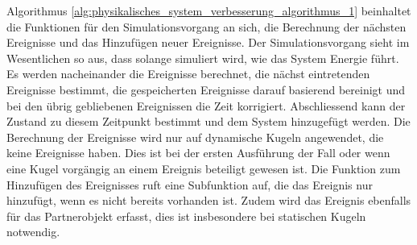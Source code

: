 Algorithmus \ref{alg:physikalisches_system_verbesserung_algorithmus_1} beinhaltet die Funktionen für den Simulationsvorgang
an sich, die Berechnung der nächsten Ereignisse und das Hinzufügen neuer Ereignisse. Der Simulationsvorgang sieht im
Wesentlichen so aus, dass solange simuliert wird, wie das System Energie führt. Es werden nacheinander die Ereignisse berechnet,
die nächst eintretenden Ereignisse bestimmt, die gespeicherten Ereignisse darauf basierend bereinigt und bei den übrig
gebliebenen Ereignissen die Zeit korrigiert. Abschliessend kann der Zustand zu diesem Zeitpunkt bestimmt und
dem System hinzugefügt werden. Die Berechnung der Ereignisse wird nur auf dynamische Kugeln angewendet, die keine Ereignisse haben.
Dies ist bei der ersten Ausführung der Fall oder wenn eine Kugel vorgängig an einem Ereignis beteiligt gewesen ist.
Die Funktion zum Hinzufügen des Ereignisses ruft eine Subfunktion auf, die das Ereignis nur hinzufügt, wenn es nicht bereits vorhanden ist.
Zudem wird das Ereignis ebenfalls für das Partnerobjekt erfasst, dies ist insbesondere bei statischen Kugeln notwendig.

